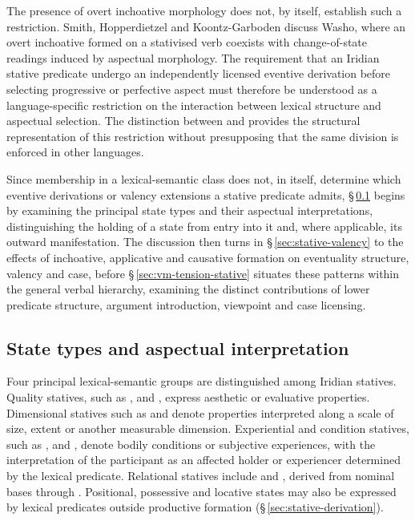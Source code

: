 The presence of overt inchoative morphology does not, by itself, establish
such a restriction. Smith, Hopperdietzel and Koontz-Garboden
\cite[§§3.2--3.3]{smithhopperdietzelkoontzgarboden2025} discuss Washo,
where an overt inchoative formed on a stativised verb coexists with
change-of-state readings induced by aspectual morphology. The requirement
that an Iridian stative predicate undergo an independently licensed eventive
derivation before selecting progressive or perfective aspect must therefore
be understood as a language-specific restriction on the interaction between
lexical structure and aspectual selection. The distinction between
 and  provides the structural representation
of this restriction without presupposing that the same division is enforced
in other languages.

Since membership in a lexical-semantic class does not, in itself, determine
which eventive derivations or valency extensions a stative predicate admits,
§\,\ref{sec:stative-stability} begins by examining the principal state
types and their aspectual interpretations, distinguishing the holding of a
state from entry into it and, where applicable, its outward manifestation.
The discussion then turns in §\,\ref{sec:stative-valency} to the effects
of inchoative, applicative and causative formation on eventuality structure,
valency and case, before §\,\ref{sec:vm-tension-stative} situates these
patterns within the general verbal hierarchy, examining the distinct
contributions of lower predicate structure, argument introduction,
viewpoint and case licensing.

\subsection{State types and aspectual interpretation}\label{sec:stative-stability}

Four principal lexical-semantic groups are distinguished among Iridian
statives. Quality statives, such as  ,
  and  , express aesthetic
or evaluative properties. Dimensional statives such as 
 and   denote properties interpreted
along a scale of size, extent or another measurable dimension. Experiential
and condition statives, such as  , 
 and  , denote bodily conditions or
subjective experiences, with the interpretation of the participant as an
affected holder or experiencer determined by the lexical predicate. Relational
statives include   and 
, derived from nominal bases through .
Positional, possessive and locative states may also be expressed by lexical
predicates outside productive  formation
(§\,\ref{sec:stative-derivation}).

